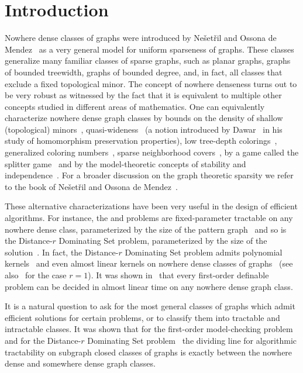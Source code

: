\section{Introduction}

Nowhere dense classes of graphs were introduced 
by Nešetřil and Ossona de 
Mendez~\cite{nevsetvril2010first,nevsetvril2011nowhere} as a very 
general model
for uniform sparseness of graphs. These classes generalize many 
familiar classes of sparse graphs, such as planar graphs, graphs 
of bounded treewidth,  graphs of bounded degree, and, in fact, 
all classes that exclude a fixed 
topological minor.
The concept of nowhere denseness
turns out to be very robust as witnessed by the fact that it is equivalent 
to multiple other concepts studied in different areas of mathematics. 
One can equivalently characterize nowhere dense graph classes 
by bounds on the density of shallow (topological)
minors~\cite{nevsetvril2010first,nevsetvril2011nowhere},
quasi-wideness~\cite{nevsetvril2011nowhere} (a notion introduced by
Dawar~\cite{dawar2010homomorphism} in his study of homomorphism
preservation properties), low tree-depth
colorings~\cite{nevsetvril2008grad}, generalized coloring
numbers~\cite{zhu2009coloring}, sparse neighborhood
covers~\cite{GroheKRSS15,grohe2014deciding}, by a game called the
splitter game~\cite{grohe2014deciding} and by the model-theoretic
concepts of stability and independence~\cite{adler2014interpreting}.
For a broader discussion on the graph theoretic sparsity we refer to the book
of Ne\v{s}et\v{r}il and Ossona de Mendez~\cite{sparsity}.

These alternative characterizations have been very useful in 
the design of efficient algorithms. For instance, 
the {} and {} problems 
are fixed-parameter tractable on any nowhere dense
class, parameterized by the size of the pattern graph~\cite{nevsetvril2010first}
and so is the {\sc Distance-$r$ Dominating Set} problem, parameterized
by the size of the solution~\cite{DawarK09}. In fact, 
the {\sc Distance-$r$ Dominating Set} problem admits
polynomial kernels~\cite{siebertz2016polynomial} and even 
almost linear kernels on nowhere dense classes of 
graphs~\cite{eickmeyer2016neighborhood}
(see also~\cite{drange2016kernelization} for the case $r=1$). 
It was shown in~\cite{grohe2014deciding}
that every first-order definable problem can be decided in
almost linear time on any nowhere dense graph class.

It is a natural question to ask for the most general classes of graphs
which admit efficient solutions for certain problems, or to 
classify them into tractable and intractable classes. It was shown 
that for the first-order model-checking problem~\cite{dvovrak2013testing} and for
the {\sc Distance-$r$ Dominating Set} problem~\cite{drange2016kernelization} 
the dividing line for algorithmic tractability 
on subgraph closed classes of graphs is exactly between the
nowhere dense and somewhere dense graph classes. 

